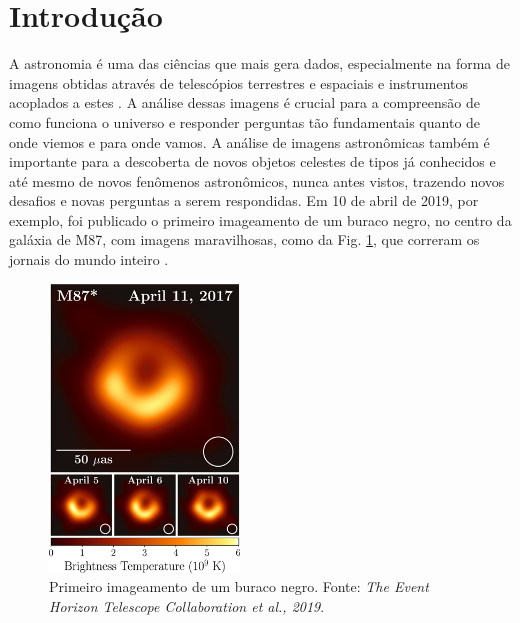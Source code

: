 \documentclass[a4,12pt]{horizon-theme}
\begin{document}
\horizonCover

\horizonTitle

\horizonAbstract

\newpage

\tableofcontents

\newpage

\onehalfspacing
\section{Introdução}
A astronomia é uma das ciências que mais gera dados, especialmente na forma de imagens obtidas através de telescópios terrestres e espaciais e instrumentos acoplados a estes \citep{astronomy_bigdata}. A análise dessas imagens é crucial para a compreensão de como funciona o universo e responder perguntas tão fundamentais quanto de onde viemos e para onde vamos. A análise de imagens astronômicas também é importante para a descoberta de novos objetos celestes de tipos já conhecidos e até mesmo de novos fenômenos astronômicos, nunca antes vistos, trazendo novos desafios e novas perguntas a serem respondidas. Em 10 de abril de 2019, por exemplo, foi publicado o primeiro imageamento de um buraco negro, no centro da galáxia de M87, com imagens maravilhosas, como da Fig. \ref{fig:m87_blackhole}, que correram os jornais do mundo inteiro \citep{M87_blackhole}.

\begin{figure}[!ht]
  \centering
  \includegraphics[width=0.45\textwidth]{figures/M87_blackhole.png}
  \caption[Primeiro imageamento de um buraco negro.]{Primeiro imageamento de um buraco negro. Fonte: \emph{The Event Horizon Telescope Collaboration et al., 2019}.}
  \label{fig:m87_blackhole}
\end{figure}
\end{document}
